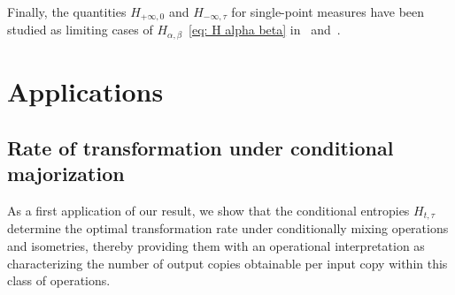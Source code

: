 \documentclass[aps,pra,11pt,onecolumn,nofootinbib,tightenlines]{revtex4-2}
\theoremstyle{definition}
\begin{document}
Finally, the quantities $ H_{+\infty,0}$ and $H_{-\infty,\tau}$ for single-point measures have been studied as limiting cases of
$H_{\alpha,\beta}$~\eqref{eq: H alpha beta} in~\cite{li2025two} and~\cite{rubboli2024quantum}.




\section{Applications}
\label{sec: Applications}
\subsection{Rate of transformation under conditional majorization}
As a first application of our result, we show that the conditional entropies $H_{t,\tau}$ determine the optimal transformation rate under conditionally mixing operations and isometries, thereby providing them with an operational interpretation as characterizing the number of output copies obtainable per input copy within this class of operations.
\end{document}
